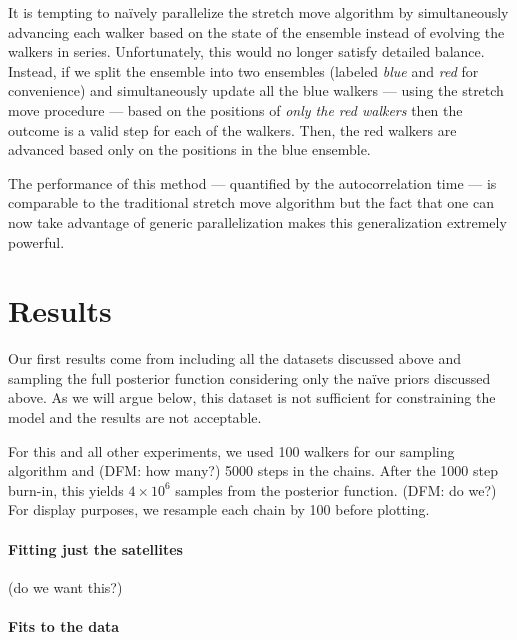 \documentclass[preprint,12pt]{aastex}
\begin{document}
It is tempting to na\"ively parallelize the stretch move algorithm by
simultaneously advancing each walker based on the state of the ensemble
instead of evolving the walkers in series. Unfortunately, this would no longer
satisfy detailed balance. Instead, if we split the ensemble into two ensembles
(labeled \emph{blue} and \emph{red} for convenience) and simultaneously update
all the blue walkers --- using the stretch move procedure --- based on the
positions of \emph{only the
red walkers} then the outcome is a valid step for each of the walkers. Then,
the red walkers are advanced based only on the positions in the blue ensemble.

The performance of this method --- quantified by the autocorrelation time ---
is comparable to the traditional stretch move algorithm but the fact that one
can now take advantage of generic parallelization makes this generalization
extremely powerful.

\section{Results}

Our first results come from including all the datasets discussed above and
sampling the full posterior function considering only the na\"ive priors
discussed above. As we will argue below, this dataset is not sufficient
for constraining the model and the results are not acceptable.

For this and all other experiments, we used 100 walkers for our sampling
algorithm and (DFM: how many?) 5000 steps in the chains. After the 1000
step burn-in, this yields $4\times10^6$ samples from the posterior function.
(DFM: do we?) For display purposes, we resample each chain by 100 before
plotting.

\paragraph{Fitting just the satellites}

(do we want this?)

\paragraph{Fits to the data}
\end{document}

